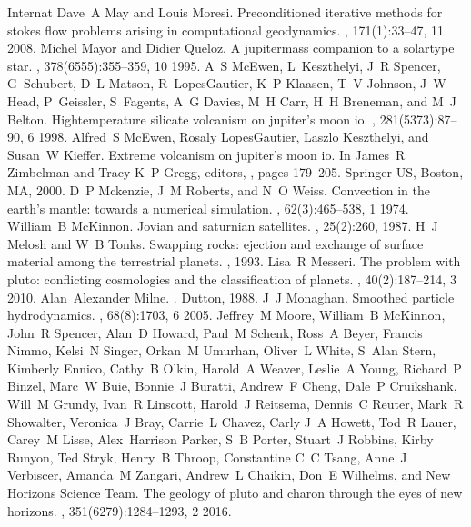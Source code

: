 \documentclass[letterpaper,10pt,english]{jupyterBook}
\begin{document}
\begin{sphinxthebibliography}{Internat}
\sphinxAtStartPar
Dave A May and Louis Moresi. Preconditioned iterative methods for stokes flow problems arising in computational geodynamics. , 171(1):33–47, 11 2008.
\sphinxAtStartPar
Michel Mayor and Didier Queloz. A jupiter\sphinxhyphen{}mass companion to a solar\sphinxhyphen{}type star. , 378(6555):355–359, 10 1995.
\sphinxAtStartPar
A S McEwen, L Keszthelyi, J R Spencer, G Schubert, D L Matson, R Lopes\sphinxhyphen{}Gautier, K P Klaasen, T V Johnson, J W Head, P Geissler, S Fagents, A G Davies, M H Carr, H H Breneman, and M J Belton. High\sphinxhyphen{}temperature silicate volcanism on jupiter's moon io. , 281(5373):87–90, 6 1998.
\sphinxAtStartPar
Alfred S McEwen, Rosaly Lopes\sphinxhyphen{}Gautier, Laszlo Keszthelyi, and Susan W Kieffer. Extreme volcanism on jupiter's moon io. In James R Zimbelman and Tracy K P Gregg, editors, , pages 179–205. Springer US, Boston, MA, 2000.
\sphinxAtStartPar
D P Mckenzie, J M Roberts, and N O Weiss. Convection in the earth's mantle: towards a numerical simulation. , 62(3):465–538, 1 1974.
\sphinxAtStartPar
William B McKinnon. Jovian and saturnian satellites. , 25(2):260, 1987.
\sphinxAtStartPar
H J Melosh and W B Tonks. Swapping rocks: ejection and exchange of surface material among the terrestrial planets. , 1993.
\sphinxAtStartPar
Lisa R Messeri. The problem with pluto: conflicting cosmologies and the classification of planets. , 40(2):187–214, 3 2010.
\sphinxAtStartPar
Alan Alexander Milne. . Dutton, 1988.
\sphinxAtStartPar
J J Monaghan. Smoothed particle hydrodynamics. , 68(8):1703, 6 2005.
\sphinxAtStartPar
Jeffrey M Moore, William B McKinnon, John R Spencer, Alan D Howard, Paul M Schenk, Ross A Beyer, Francis Nimmo, Kelsi N Singer, Orkan M Umurhan, Oliver L White, S Alan Stern, Kimberly Ennico, Cathy B Olkin, Harold A Weaver, Leslie A Young, Richard P Binzel, Marc W Buie, Bonnie J Buratti, Andrew F Cheng, Dale P Cruikshank, Will M Grundy, Ivan R Linscott, Harold J Reitsema, Dennis C Reuter, Mark R Showalter, Veronica J Bray, Carrie L Chavez, Carly J A Howett, Tod R Lauer, Carey M Lisse, Alex Harrison Parker, S B Porter, Stuart J Robbins, Kirby Runyon, Ted Stryk, Henry B Throop, Constantine C C Tsang, Anne J Verbiscer, Amanda M Zangari, Andrew L Chaikin, Don E Wilhelms, and New Horizons Science Team. The geology of pluto and charon through the eyes of new horizons. , 351(6279):1284–1293, 2 2016.

\end{sphinxthebibliography}
\end{document}
